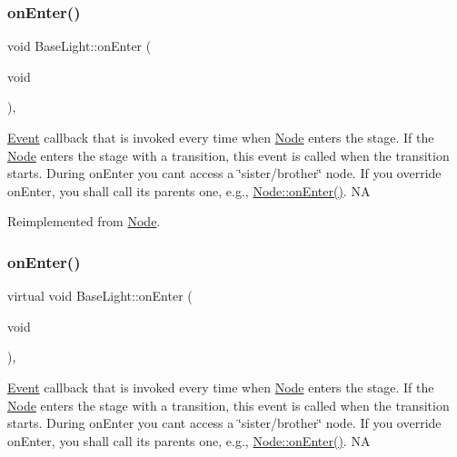 \subsubsection{\texorpdfstring{on\+Enter()}{onEnter()}\hspace{0.1cm}{\footnotesize\ttfamily [1/2]}}
{\footnotesize\ttfamily void Base\+Light\+::on\+Enter (\begin{DoxyParamCaption}\item[{void}]{ }\end{DoxyParamCaption})\hspace{0.3cm}{\ttfamily [override]}, {\ttfamily [virtual]}}

\hyperlink{classEvent}{Event} callback that is invoked every time when \hyperlink{classNode}{Node} enters the \textquotesingle{}stage\textquotesingle{}. If the \hyperlink{classNode}{Node} enters the \textquotesingle{}stage\textquotesingle{} with a transition, this event is called when the transition starts. During on\+Enter you can\textquotesingle{}t access a \char`\"{}sister/brother\char`\"{} node. If you override on\+Enter, you shall call its parent\textquotesingle{}s one, e.\+g., \hyperlink{classNode_a7f51764c4afd5018a052b9ef71c03374}{Node\+::on\+Enter()}.  NA 

Reimplemented from \hyperlink{classNode_a7f51764c4afd5018a052b9ef71c03374}{Node}.

\mbox{\label{classBaseLight_ae53451e8579dce26537726a634fc81f5}} 
\subsubsection{\texorpdfstring{on\+Enter()}{onEnter()}\hspace{0.1cm}{\footnotesize\ttfamily [2/2]}}
{\footnotesize\ttfamily virtual void Base\+Light\+::on\+Enter (\begin{DoxyParamCaption}\item[{void}]{ }\end{DoxyParamCaption})\hspace{0.3cm}{\ttfamily [override]}, {\ttfamily [virtual]}}

\hyperlink{classEvent}{Event} callback that is invoked every time when \hyperlink{classNode}{Node} enters the \textquotesingle{}stage\textquotesingle{}. If the \hyperlink{classNode}{Node} enters the \textquotesingle{}stage\textquotesingle{} with a transition, this event is called when the transition starts. During on\+Enter you can\textquotesingle{}t access a \char`\"{}sister/brother\char`\"{} node. If you override on\+Enter, you shall call its parent\textquotesingle{}s one, e.\+g., \hyperlink{classNode_a7f51764c4afd5018a052b9ef71c03374}{Node\+::on\+Enter()}.  NA 

